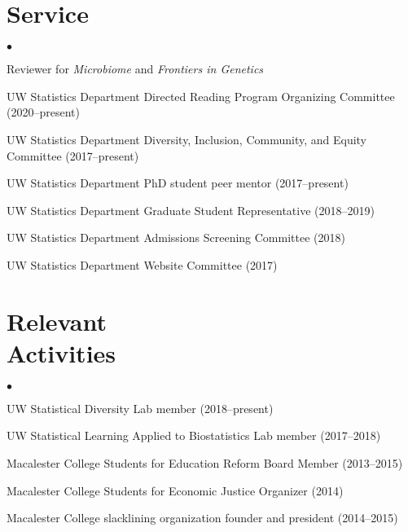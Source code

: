 \documentclass[margin,centered]{res}
\newenvironment{list1}{
  \begin{list}{\ding{113}}{%
      \setlength{\itemsep}{0in}
      \setlength{\parsep}{0in} \setlength{\parskip}{0in}
      \setlength{\topsep}{0in} \setlength{\partopsep}{0in}
      \setlength{\leftmargin}{0.17in}}}{\end{list}}
\newenvironment{list2}{
  \begin{list}{$\bullet$}{%
      \setlength{\itemsep}{0in}
      \setlength{\parsep}{0in} \setlength{\parskip}{0in}
      \setlength{\topsep}{0in} \setlength{\partopsep}{0in}
      \setlength{\leftmargin}{0.2in}}}{\end{list}}
\begin{document}
\begin{resume}
\newpage

\section{\sc Service}

\begin{list1}
\item[]
\begin{list2}
\vspace*{.05in}
\item Reviewer for \textit{Microbiome} and \textit{Frontiers in Genetics}
\item UW Statistics Department Directed Reading Program Organizing Committee (2020--present)
\item UW Statistics Department Diversity, Inclusion, Community, and Equity Committee (2017--present)
\item UW Statistics Department PhD student peer mentor (2017--present)
\item UW Statistics Department Graduate Student Representative (2018--2019)
\item UW Statistics Department Admissions Screening Committee (2018)
\item UW Statistics Department Website Committee (2017)
\end{list2}
\end{list1}

\section{\sc Relevant \\ Activities}


\begin{list1}
\item[]
\begin{list2}
\vspace*{.05in}
\item UW Statistical Diversity Lab member (2018--present)
\item UW Statistical Learning Applied to Biostatistics Lab member (2017--2018)
\item Macalester College Students for Education Reform Board Member (2013--2015)
\item Macalester College Students for Economic Justice Organizer (2014)
\item Macalester College slacklining organization founder and president (2014--2015)
\end{list2}
\end{list1}



%
\thispagestyle{lastpage}
\end{resume}
\end{document}
